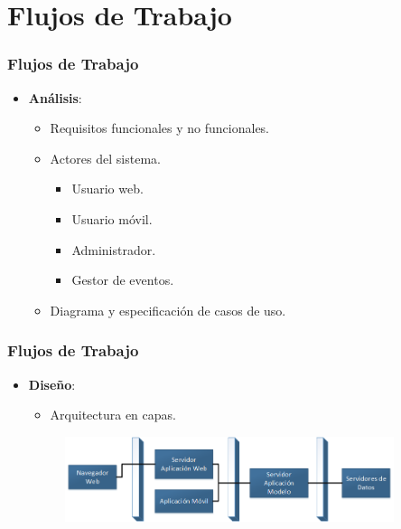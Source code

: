 \documentclass[usenames,dvipsnames]{beamer}
\begin{document}
\section{Flujos de Trabajo}
\begin{frame}
\frametitle{Flujos de Trabajo}
\begin{itemize}
\item \textbf{Análisis}:
	\begin{itemize}
		\item Requisitos funcionales y no funcionales.
		\item Actores del sistema.
			\begin{itemize}
				\item Usuario web.
				\item Usuario móvil.
				\item Administrador.
				\item Gestor de eventos.
			\end{itemize}
		\item Diagrama y especificación de casos de uso.
	\end{itemize}
\end{itemize}
\end{frame}

\begin{frame}
\frametitle{Flujos de Trabajo}
\begin{itemize}
\item \textbf{Diseño}:
	\begin{itemize}
		\item Arquitectura en capas.
	\end{itemize}
	\vspace{0.4cm}
		\begin{figure}
		\includegraphics[height=2.5cm]{./img/arqsistema.png}
		\end{figure}
\end{itemize}
\end{frame}
\end{document}
